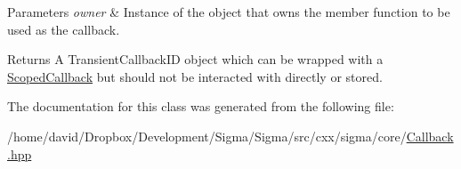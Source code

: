 \begin{DoxyParams}{Parameters}
{\em owner} & Instance of the object that owns the member function to be used as the callback.\\
\hline
\end{DoxyParams}
\begin{DoxyReturn}{Returns}
A Transient\-Callback\-I\-D object which can be wrapped with a \hyperlink{classsigma_1_1core_1_1_scoped_callback}{Scoped\-Callback} but should not be interacted with directly or stored. 
\end{DoxyReturn}


The documentation for this class was generated from the following file\-:\begin{DoxyCompactItemize}
\item 
/home/david/\-Dropbox/\-Development/\-Sigma/\-Sigma/src/cxx/sigma/core/\hyperlink{_callback_8hpp}{Callback.\-hpp}\end{DoxyCompactItemize}
